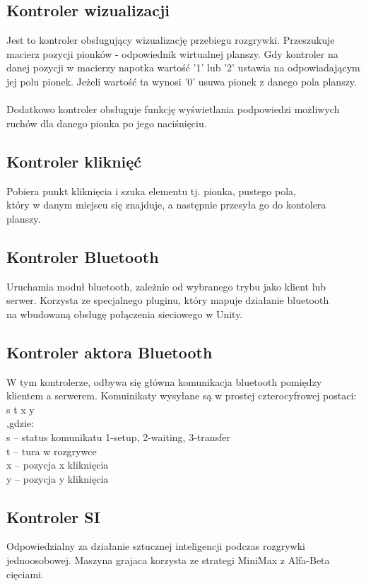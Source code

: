 \subsection{Kontroler wizualizacji}
Jest to kontroler obsługujący wizualizację przebiegu rozgrywki. 
Przeszukuje macierz pozycji pionków - odpowiednik wirtualnej planszy. Gdy kontroler na danej pozycji w macierzy napotka wartość '1' lub '2' ustawia na odpowiadającym jej polu pionek. Jeżeli wartość ta wynosi '0' usuwa pionek z danego pola planszy.\\
\\
Dodatkowo kontroler obsługuje funkcję wyświetlania podpowiedzi możliwych ruchów dla danego pionka po jego naciśnięciu.

\subsection{Kontroler kliknięć}
Pobiera punkt kliknięcia i szuka elementu tj. pionka, pustego pola,\\
który w danym miejscu się znajduje, a następnie przesyła go do kontolera planszy.

\subsection{Kontroler Bluetooth}
Uruchamia moduł bluetooth, zależnie od wybranego trybu jako klient lub\\
serwer. Korzysta ze specjalnego pluginu, który mapuje działanie bluetooth\\
na wbudowaną obsługę połączenia sieciowego w Unity.

\subsection{Kontroler aktora Bluetooth}
W tym kontrolerze, odbywa się główna komunikacja bluetooth pomiędzy\\
klientem a serwerem. Komuinikaty wysyłane są w prostej czterocyfrowej postaci:\\
s t x y \\
,gdzie: \\
s – status komunikatu 1-setup, 2-waiting, 3-transfer \\
t – tura w rozgrywce \\
x – pozycja x kliknięcia \\
y – pozycja y kliknięcia \\

\subsection{Kontroler SI}
Odpowiedzialny za działanie sztucznej inteligencji podczas rozgrywki jednoosobowej. Maszyna grajaca korzysta ze strategi MiniMax z Alfa-Beta cięciami.

